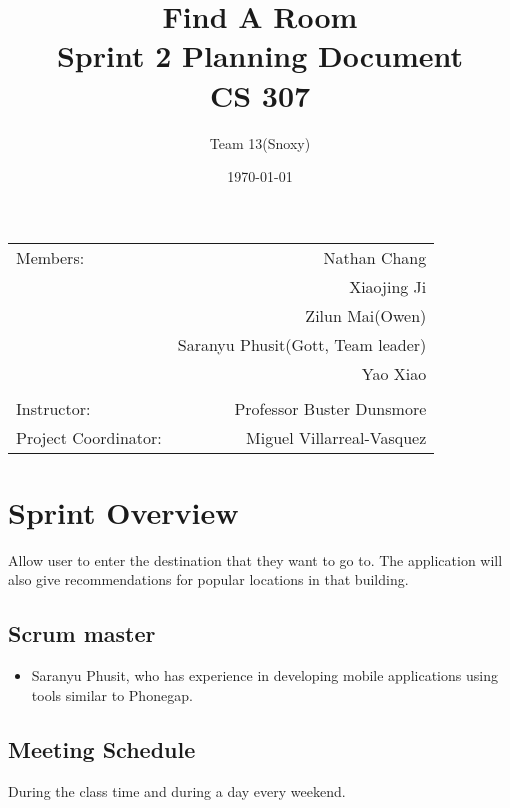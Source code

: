\documentclass[12pt]{article}
\title{\textbf{Find A Room} \\ Sprint 2 Planning Document \\ CS 307} %
\author{Team \textsc{13}(Snoxy)} %
\date{\today} %
\begin{document}
\maketitle %

\begin{center}
\begin{tabular}{l r}
Members: & Nathan Chang \\ %
& Xiaojing Ji \\
& Zilun Mai(Owen) \\
& Saranyu Phusit(Gott, Team leader) \\
& Yao Xiao \\
\\
\bigskip
Instructor: & Professor Buster Dunsmore \\%
Project Coordinator: & Miguel Villarreal-Vasquez %

\end{tabular}
\end{center}




\newpage

\section{Sprint Overview}

Allow user to enter the destination that they want to go to. The application will also give recommendations for popular locations in that building.


\subsection{Scrum master}
\begin{itemize}
\item Saranyu Phusit, who has experience in developing mobile applications using tools similar to Phonegap.
\end{itemize}
\subsection{Meeting Schedule}
During the class time and during a day every weekend.
\end{document}
